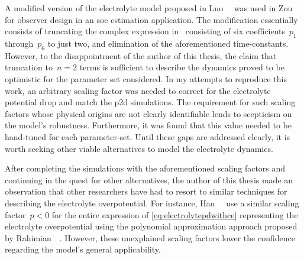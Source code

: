 A modified version of the electrolyte model proposed in Luo~\etal~\cite{Luo2013}
was  used  in Zou~\etal~\cite{Zou2016a}  for  observer  design in  an  \gls{soc}
estimation  application. The  modification  essentially  consists of  truncating
the complex  expression in~\cite{Luo2013}  consisting of  six coefficients~$p_1$
through~$p_6$ to just two, and elimination of the aforementioned time-constants.
However, to  the disappointment  of the  author of this  thesis, the  claim that
truncation to~$n=2$ terms is sufficient to  describe the dynamics proved  to be
optimistic for  the parameter set considered.  In my attempts to  reproduce this
work, an  arbitrary scaling  factor was  needed to  correct for  the electrolyte
potential drop  and match  the \gls{p2d} simulations.  The requirement  for such
scaling factors  whose physical  origins are not  clearly identifiable  lends to
scepticism on the model's robustness. Furthermore,  it was found that this value
needed to be  hand-tuned for each parameter-set. Until these  gaps are addressed
clearly, it is worth seeking other  viable alternatives to model the electrolyte
dynamics.

After  completing  the  simulations  with  the  aforementioned  scaling  factors
and  continuing  in  the  quest  for other  alternatives,  the  author  of  this
thesis  made  an observation  that  other  researchers  have  had to  resort  to
similar techniques  for describing the electrolyte  overpotential. For instance,
Han~\etal~\cite{Han2015a}  use a  similar  scaling factor~$p<0$  for the  entire
expression   of  \cref{eq:electrolytepdwithce}   representing  the   electrolyte
overpotential   using  the   polynomial  approximation   approach  proposed   by
Rahimian~\etal~\cite{KhaleghiRahimian2013}.  However, these  unexplained scaling
factors lower the confidence regarding the model's general applicability.


